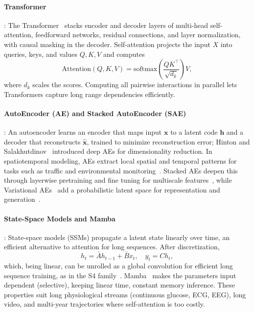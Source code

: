 \documentclass[journal]{IEEEtran}
\begin{document}
\paragraph{Transformer}: The Transformer~\cite{vaswani2017attention} stacks encoder and decoder layers of multi-head self-attention, feedforward networks, residual connections, and layer normalization, with causal masking in the decoder. Self-attention projects the input $X$ into queries, keys, and values $Q,K,V$ and computes
\begin{equation}
\mathrm{Attention}(Q,K,V) = \mathrm{softmax}\!\left(\frac{QK^\top}{\sqrt{d_k}}\right) V,
\end{equation}
where $d_k$ scales the scores. Computing all pairwise interactions in parallel lets Transformers capture long range dependencies efficiently.

\paragraph{AutoEncoder (AE) and Stacked AutoEncoder (SAE)}: An autoencoder learns an encoder that maps input $\mathbf{x}$ to a latent code $\mathbf{h}$ and a decoder that reconstructs $\hat{\mathbf{x}}$, trained to minimize reconstruction error; Hinton and Salakhutdinov~\cite{hinton2006reducing} introduced deep AEs for dimensionality reduction. In spatiotemporal modeling, AEs extract local spatial and temporal patterns for tasks such as traffic and environmental monitoring~\cite{vincent2008extracting, bengio2009learning}. Stacked AEs deepen this through layerwise pretraining and fine tuning for multiscale features~\cite{erhan2010why, ranzato2007unsupervised, masci2011stacked, vincent2010stacked}, while Variational AEs~\cite{kingma2013auto} add a probabilistic latent space for representation and generation~\cite{glorot2010understanding, zhang2017deep, yu2018spatio}.

\paragraph{State-Space Models and Mamba}: State-space models (SSMs) propagate a latent state linearly over time, an efficient alternative to attention for long sequences. After discretization,
\begin{equation}
h_t = \bar{A} h_{t-1} + \bar{B} x_t, \quad y_t = C h_t,
\end{equation}
which, being linear, can be unrolled as a global convolution for efficient long sequence training, as in the S4 family~\cite{smith2023convssm}. Mamba~\cite{gu2023mamba} makes the parameters input dependent (selective), keeping linear time, constant memory inference. These properties suit long physiological streams (continuous glucose, ECG, EEG), long video, and multi-year trajectories where self-attention is too costly.
\end{document}
